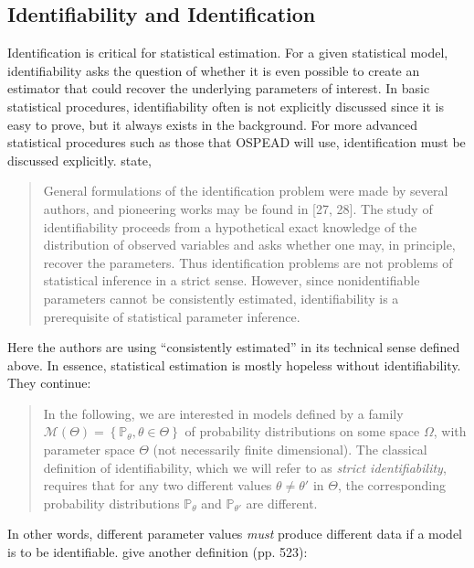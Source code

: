 \documentclass[english]{article}
\begin{document}
\subsection{Identifiability and Identification\label{subsec:Identifiability-and-Identification}}

Identification is critical for statistical estimation. For a given
statistical model, identifiability asks the question of whether it
is even possible to create an estimator that could recover the underlying
parameters of interest. In basic statistical procedures, identifiability
often is not explicitly discussed since it is easy to prove, but it
always exists in the background. For more advanced statistical procedures
such as those that OSPEAD will use, identification must be discussed
explicitly. \cite{AllmanMatiasRhodes2009} state,
\begin{quote}
General formulations of the identification problem were made by several
authors, and pioneering works may be found in {[}27, 28{]}. The study
of identifiability proceeds from a hypothetical exact knowledge of
the distribution of observed variables and asks whether one may, in
principle, recover the parameters. Thus identification problems are
not problems of statistical inference in a strict sense. However,
since nonidentifiable parameters cannot be consistently estimated,
identifiability is a prerequisite of statistical parameter inference.
\end{quote}
Here the authors are using ``consistently estimated'' in its technical
sense defined above. In essence, statistical estimation is mostly
hopeless without identifiability. They continue:
\begin{quote}
In the following, we are interested in models defined by a family
$\mathcal{M}(\Theta)=\left\{ \mathbb{P}_{\theta},\theta\in\Theta\right\} $
of probability distributions on some space $\Omega$, with parameter
space $\Theta$ (not necessarily finite dimensional). The classical
definition of identifiability, which we will refer to as \textit{strict
identifiability}, requires that for any two different values $\theta\neq\theta'$
in $\Theta$, the corresponding probability distributions $\mathbb{P}_{\theta}$
and $\mathbb{P}_{\theta'}$ are different.
\end{quote}
In other words, different parameter values \textit{must} produce different
data if a model is to be identifiable. \cite{CasellaBerger2002} give
another definition (pp. 523):
\end{document}
